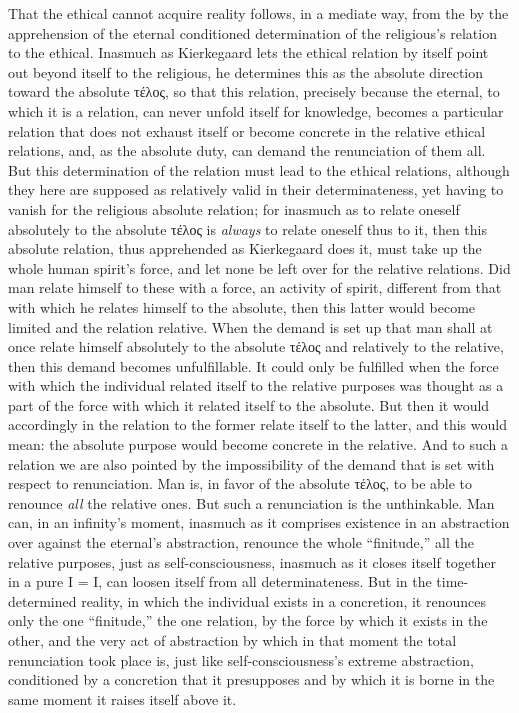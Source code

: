 \documentclass[12pt,a4paper]{book}
\begin{document}
That the ethical cannot acquire reality follows, in a mediate way, from the by the apprehension of the eternal
conditioned determination of the religious's relation to the ethical. Inasmuch as Kierkegaard lets the ethical
relation by itself point out beyond itself to the religious, he determines this as the absolute direction toward
the absolute τέλος, so that this relation, precisely because the eternal, to which it is a relation, can never
unfold itself for knowledge, becomes a particular relation that does not exhaust itself or become concrete in
the relative ethical relations, and, as the absolute duty, can demand the renunciation of them all. But this
determination of the relation must lead to the ethical relations, although they here are supposed as relatively
valid in their determinateness, yet having to vanish for the religious absolute relation; for inasmuch as to
relate oneself absolutely to the absolute τέλος is \emph{always} to relate oneself thus to it, then this absolute
relation, thus apprehended as Kierkegaard does it, must take up the whole human spirit's force, and let none be
left over for the relative relations. Did man relate himself to these with a force, an activity of spirit,
different from that with which he relates himself to the absolute, then this latter would become limited and the
relation relative. When the demand is set up that man shall at once relate himself absolutely to the absolute
τέλος and relatively to the relative, then this demand becomes unfulfillable. It could only be fulfilled when
the force with which the individual related itself to the relative purposes was thought as a part of the force
with which it related itself to the absolute. But then it would accordingly in the relation to the former relate
itself to the latter, and this would mean: the absolute purpose would become concrete in the relative. And to
such a relation we are also pointed by the impossibility of the demand that is set with respect to renunciation.
Man is, in favor of the absolute τέλος, to be able to renounce \emph{all} the relative ones. But such a renunciation is
the unthinkable. Man can, in an infinity's moment, inasmuch as it comprises existence in an abstraction over
against the eternal's abstraction, renounce the whole ``finitude,'' all the relative purposes, just as
self-consciousness, inasmuch as it closes itself together in a pure I = I, can loosen itself from all
determinateness. But in the time-determined reality, in which the individual exists in a concretion, it renounces
only the one ``finitude,'' the one relation, by the force by which it exists in the other, and the very act of
abstraction by which in that moment the total renunciation took place is, just like self-consciousness's extreme
abstraction, conditioned by a concretion that it presupposes and by which it is borne in the same moment it
raises itself above it.
\end{document}
